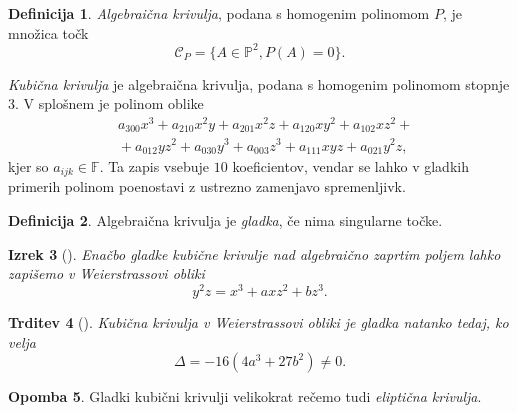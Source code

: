 \documentclass[12pt,a4paper,twoside]{article}
\theoremstyle{definition} %
\newtheorem{definicija}{Definicija}[section]
\newtheorem{opomba}[definicija]{Opomba}
\theoremstyle{plain} %
\newtheorem{izrek}[definicija]{Izrek}
\newtheorem{trditev}[definicija]{Trditev}
\numberwithin{equation}{section}  %
\newcommand{\F}{\mathbb F}
\begin{document}
\begin{definicija}
\emph{Algebraična krivulja}, podana s homogenim polinomom $P$, je množica točk 
$$\mathcal{C}_P= \{ A \in \mathbb{P}^2, P(A) = 0 \}.$$
\end{definicija}

\emph{Kubična krivulja} je algebraična krivulja, podana s homogenim polinomom stopnje 3. V splošnem je polinom oblike
\begin{align}
&{} a_{300}x^3+a_{210}x^2y+a_{201}x^2z+a_{120}xy^2+a_{102}xz^2+ \nonumber \\
&{}+a_{012}yz^2+a_{030}y^3+a_{003}z^3+a_{111}xyz+a_{021}y^2z, \nonumber
\end{align}
kjer so $a_{ijk} \in \F$.
Ta zapis vsebuje $10$ koeficientov, vendar se lahko v gladkih primerih polinom poenostavi z ustrezno zamenjavo spremenljivk.
\begin{definicija}
Algebraična krivulja je \emph{gladka}, če nima singularne točke.
\end{definicija}

\begin{izrek}[]
Enačbo gladke kubične krivulje nad algebraično zaprtim poljem lahko zapišemo v Weierstrassovi obliki
$$y^2z = x^3 + axz^2 + bz^3.$$
\end{izrek}

\begin{trditev}[]
Kubična krivulja v Weierstrassovi obliki je gladka natanko tedaj, ko velja
$$\Delta = -16(4a^3+27b^2) \neq 0.$$
\end{trditev}

\begin{opomba}
Gladki kubični krivulji  velikokrat rečemo tudi \emph{eliptična krivulja}.
\end{opomba}
\end{document}
